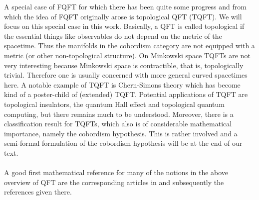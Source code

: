 A special case of FQFT for which there has been quite some progress and from which the idea of FQFT originally arose is topological QFT (TQFT). We will focus on this special case in this work. Basically, a QFT is called topological if the essential things like observables do not depend on the metric of the spacetime. Thus the manifolds in the cobordism category are not equipped with a metric (or other non-topological structure). On Minkowski space TQFTs are not very interesting because Minkowski space is contractible, that is, topologically trivial. Therefore one is usually concerned with more general curved spacetimes here. A notable example of TQFT is Chern-Simons theory which has become kind of a poster-child of (extended) TQFT. Potential applications of TQFT are topological insulators, the quantum Hall effect and topological quantum computing, but there remains much to be understood. Moreover, there is a classification result for TQFTs, which also is of considerable mathematical importance, namely the cobordism hypothesis. This is rather involved and a semi-formal formulation of the cobordism hypothesis will be at the end of our text.
\\\\
A good first mathematical reference for many of the notions in the above overview of QFT are the corresponding articles in \cite{wiki-nlab0000} and subsequently the references given there.
